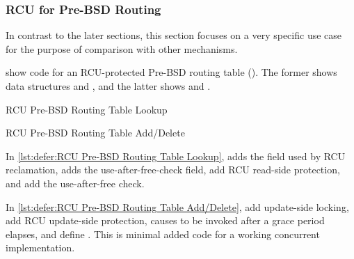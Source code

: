 \subsubsection{RCU for Pre-BSD Routing}
\label{sec:defer:RCU for Pre-BSD Routing}

In contrast to the later sections, this section focuses on a very
specific use case for the purpose of comparison with other mechanisms.

show code for an RCU-protected Pre-BSD routing table
().
The former shows data structures and ,
and the latter shows  and .

\begin{listing}

\caption{RCU Pre-BSD Routing Table Lookup}
\label{lst:defer:RCU Pre-BSD Routing Table Lookup}
\end{listing}

\begin{listing}

\caption{RCU Pre-BSD Routing Table Add/Delete}
\label{lst:defer:RCU Pre-BSD Routing Table Add/Delete}
\end{listing}

\begin{fcvref}
In \cref{lst:defer:RCU Pre-BSD Routing Table Lookup},
 adds the  field used by RCU reclamation,
 adds the  use-after-free-check field,
add RCU read-side protection,
and  add the use-after-free check.
\end{fcvref}
\begin{fcvref}
In \cref{lst:defer:RCU Pre-BSD Routing Table Add/Delete},
 add update-side locking,
 add RCU update-side protection,
 causes  to be invoked after
a grace period elapses,
and  define .
This is minimal added code for a working concurrent implementation.
\end{fcvref}

